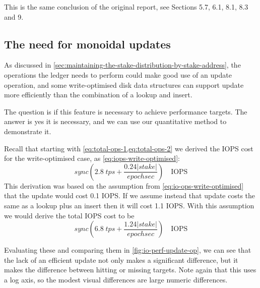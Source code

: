 \documentclass[11pt,a4paper]{article}
\begin{document}
This is the same conclusion of the original report, see \cite{utxo-db} Sections
5.7, 6.1, 8.1, 8.3 and 9.

\subsection{The need for monoidal updates}

As discussed in \cref{sec:maintaining-the-stake-distribution-by-stake-address},
the operations the ledger needs to perform could make good use of an
{\sc update} operation, and some write-optimised disk data structures can
support {\sc update} more efficiently than the combination of a {\sc lookup}
and {\sc insert}.

The question is if this feature is necessary to achieve performance targets.
The answer is yes it is necessary, and we can use our quantitative method to
demonstrate it.

Recall that starting with \cref{eq:total-ops-1,eq:total-ops-2} we derived the
IOPS cost for the write-optimised case, as \cref{eq:iops-write-optimised}:
\begin{equation*}
\mathit{sync} \left(
    2.8 \; \mathit{tps} + \frac{0.24 |stake|}{\mathit{epochsec}}
  \right)\quad\text{IOPS}
\end{equation*}
This derivation was based on the assumption from
\cref{eq:io-ops-write-optimised} that the {\sc update} would cost 0.1 IOPS. If
we assume instead that {\sc update} costs the same as a {\sc lookup} plus an
{\sc insert} then it will cost 1.1 IOPS. With this assumption we would derive
the total IOPS cost to be
\begin{equation*}
\mathit{sync} \left(
    6.8 \; \mathit{tps} + \frac{1.24 |stake|}{\mathit{epochsec}}
  \right)\quad\text{IOPS}
\end{equation*}

Evaluating these and comparing them in \cref{fig:io-perf-update-op}, we can see
that the lack of an efficient {\sc update} not only makes a significant
difference, but it makes the difference between hitting or missing targets.
Note again that this uses a log axis, so the modest visual differences are
large numeric differences.
\end{document}
